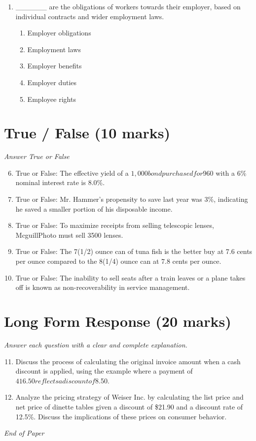 \documentclass[12pt]{article}
\begin{document}
\begin{enumerate}[label=\arabic*.]
\begin{enumerate}[label=(\alph*)]
    \item \$35,000
    \item \$55,000
    \item \$45,225
    \item \$40,000
    \item \$65,000
\end{enumerate}
\item \_\_\_\_\_\_ are the obligations of workers towards their employer, based on individual contracts and wider employment laws.
\begin{enumerate}[label=(\alph*)]
    \item Employer obligations
    \item Employment laws
    \item Employer benefits
    \item Employer duties
    \item Employee rights
\end{enumerate}
\end{enumerate}

\section*{True / False (10 marks)}
\textit{Answer True or False}
\begin{enumerate}[label=\arabic*.]
\setcounter{enumi}{5}
\item True or False: The effective yield of a $1,000 bond purchased for $960 with a 6\% nominal interest rate is 8.0\%.
\item True or False: Mr. Hammer's propensity to save last year was 3\%, indicating he saved a smaller portion of his disposable income.
\item True or False: To maximize receipts from selling telescopic lenses, McguillPhoto must sell 3500 lenses.
\item True or False: The 7(1/2) ounce can of tuna fish is the better buy at 7.6 cents per ounce compared to the 8(1/4) ounce can at 7.8 cents per ounce.
\item True or False: The inability to sell seats after a train leaves or a plane takes off is known as non-recoverability in service management.
\end{enumerate}

\section*{Long Form Response (20 marks)}
\textit{Answer each question with a clear and complete explanation.}
\begin{enumerate}[label=\arabic*.]
\setcounter{enumi}{10}
\item Discuss the process of calculating the original invoice amount when a cash discount is applied, using the example where a payment of $416.50 reflects a discount of $8.50.
\item Analyze the pricing strategy of Weiser Inc. by calculating the list price and net price of dinette tables given a discount of \$21.90 and a discount rate of 12.5\%. Discuss the implications of these prices on consumer behavior.
\end{enumerate}

\vfill
\noindent\textit{End of Paper}
\end{document}
